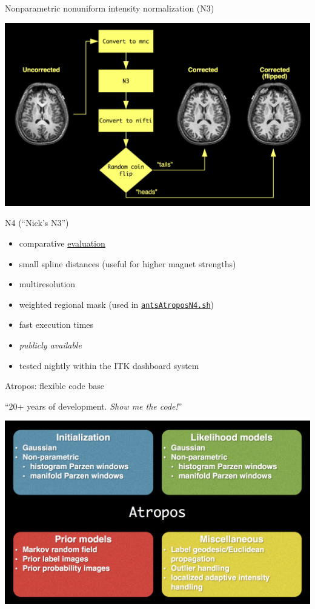 \documentclass[ignorenonframetext,]{beamer}
\begin{document}
\begin{frame}{Nonparametric nonuniform intensity normalization (N3)}

\includegraphics{./tools/n4/figures/whyN4.png}

\end{frame}

\begin{frame}[fragile]{N4 (``Nick's N3'')}

\begin{itemize}
\item
  comparative
  \href{http://www.ncbi.nlm.nih.gov/pubmed/20378467}{evaluation}
\item
  small spline distances (useful for higher magnet strengths)
\item
  multiresolution
\item
  weighted regional mask (used in
  \href{https://github.com/stnava/ANTs/blob/master/Scripts/antsAtroposN4.sh}{\texttt{antsAtroposN4.sh}})
\item
  fast execution times
\item
  \emph{publicly available}
\item
  tested nightly within the ITK dashboard system
\end{itemize}

\end{frame}

\begin{frame}{Atropos: flexible code base}

``20+ years of development. \emph{Show me the code!}''

\includegraphics{./tools/atropos/figures/atropos.png}

\end{frame}
\end{document}
